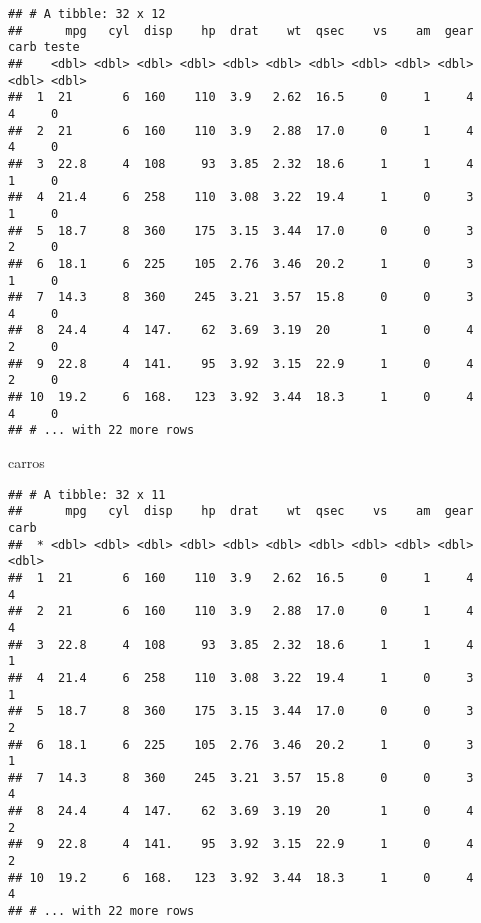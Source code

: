 \documentclass[]{book}
\newenvironment{Shaded}{\begin{snugshade}}{\end{snugshade}}
\newcommand{\DataTypeTok}[1]{\textcolor[rgb]{0.13,0.29,0.53}{#1}}
\newcommand{\DecValTok}[1]{\textcolor[rgb]{0.00,0.00,0.81}{#1}}
\newcommand{\KeywordTok}[1]{\textcolor[rgb]{0.13,0.29,0.53}{\textbf{#1}}}
\newcommand{\NormalTok}[1]{#1}
\newcommand{\OperatorTok}[1]{\textcolor[rgb]{0.81,0.36,0.00}{\textbf{#1}}}
\newcommand{\StringTok}[1]{\textcolor[rgb]{0.31,0.60,0.02}{#1}}
\begin{document}
\begin{verbatim}
## # A tibble: 32 x 12
##      mpg   cyl  disp    hp  drat    wt  qsec    vs    am  gear  carb teste
##    <dbl> <dbl> <dbl> <dbl> <dbl> <dbl> <dbl> <dbl> <dbl> <dbl> <dbl> <dbl>
##  1  21       6  160    110  3.9   2.62  16.5     0     1     4     4     0
##  2  21       6  160    110  3.9   2.88  17.0     0     1     4     4     0
##  3  22.8     4  108     93  3.85  2.32  18.6     1     1     4     1     0
##  4  21.4     6  258    110  3.08  3.22  19.4     1     0     3     1     0
##  5  18.7     8  360    175  3.15  3.44  17.0     0     0     3     2     0
##  6  18.1     6  225    105  2.76  3.46  20.2     1     0     3     1     0
##  7  14.3     8  360    245  3.21  3.57  15.8     0     0     3     4     0
##  8  24.4     4  147.    62  3.69  3.19  20       1     0     4     2     0
##  9  22.8     4  141.    95  3.92  3.15  22.9     1     0     4     2     0
## 10  19.2     6  168.   123  3.92  3.44  18.3     1     0     4     4     0
## # ... with 22 more rows
\end{verbatim}

\begin{Shaded}
\begin{Highlighting}[]
\NormalTok{carros}
\end{Highlighting}
\end{Shaded}

\begin{verbatim}
## # A tibble: 32 x 11
##      mpg   cyl  disp    hp  drat    wt  qsec    vs    am  gear  carb
##  * <dbl> <dbl> <dbl> <dbl> <dbl> <dbl> <dbl> <dbl> <dbl> <dbl> <dbl>
##  1  21       6  160    110  3.9   2.62  16.5     0     1     4     4
##  2  21       6  160    110  3.9   2.88  17.0     0     1     4     4
##  3  22.8     4  108     93  3.85  2.32  18.6     1     1     4     1
##  4  21.4     6  258    110  3.08  3.22  19.4     1     0     3     1
##  5  18.7     8  360    175  3.15  3.44  17.0     0     0     3     2
##  6  18.1     6  225    105  2.76  3.46  20.2     1     0     3     1
##  7  14.3     8  360    245  3.21  3.57  15.8     0     0     3     4
##  8  24.4     4  147.    62  3.69  3.19  20       1     0     4     2
##  9  22.8     4  141.    95  3.92  3.15  22.9     1     0     4     2
## 10  19.2     6  168.   123  3.92  3.44  18.3     1     0     4     4
## # ... with 22 more rows
\end{verbatim}

\begin{Shaded}
\end{Shaded}
\end{document}
